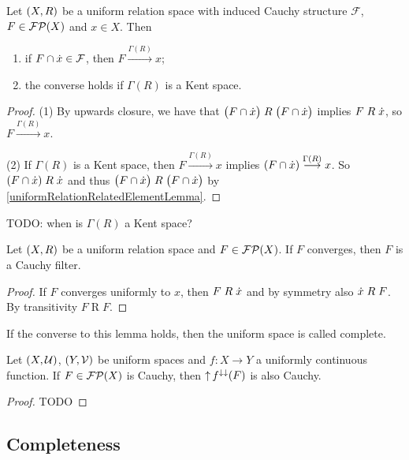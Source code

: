 \begin{lemma}
Let $\left( X,R \right)$ be a uniform relation space with induced Cauchy structure $\mathcal{F}$, $F\in \operatorname{\mathcal{FP}}(X)$ and $x\in X$. Then
\begin{enumerate}
\item if $F\cap\dot{x} \in \mathcal{F}$, then $F\overset{\Gamma(R)}{\longrightarrow} x$;
\item the converse holds if $\Gamma(R)$ is a Kent space.
\end{enumerate}
\end{lemma}
\begin{proof}
(1) By upwards closure, we have that $\big(F\cap \dot{x}\big)\mathrel{R}\big(F\cap \dot{x}\big)$ implies $F\mathrel{R}\dot{x}$, so $F\overset{\Gamma(R)}{\longrightarrow} x$.

(2) If $\Gamma(R)$ is a Kent space, then $F\overset{\Gamma(R)}{\longrightarrow} x$ implies $(F\cap\dot{x})\overset{\Gamma(R)}{\longrightarrow} x$. So $(F\cap\dot{x})\mathrel{R}\dot{x}$ and thus $\big(F\cap \dot{x}\big)\mathrel{R}\big(F\cap \dot{x}\big)$ by \ref{uniformRelationRelatedElementLemma}.
\end{proof}
TODO: when is $\Gamma(R)$ a Kent space?

\begin{lemma} \label{uniformlyConvergentImpliesCauchy}
Let $\left( X,R \right)$ be a uniform relation space and $F\in\operatorname{\mathcal{FP}}(X)$. If $F$ converges, then $F$ is a Cauchy filter.
\end{lemma}
\begin{proof}
If $F$ converges uniformly to $x$, then $F\mathrel{R}\dot{x}$ and by symmetry also $\dot{x}\mathrel{R}F$. By transitivity $F\mathrel{R}F$. 
\end{proof}
If the converse to this lemma holds, then the uniform space is called complete.

\begin{lemma} \label{continuousImageOfCauchy}
Let $\left( X,\mathcal{U} \right)$, $\left( Y,\mathcal{V} \right)$ be uniform spaces and $f: X\to Y$ a uniformly continuous function. If $F\in\operatorname{\mathcal{FP}}(X)$ is Cauchy, then $\operatorname{\uparrow} f^{\downarrow\downarrow}(F)$ is also Cauchy.
\end{lemma}
\begin{proof}
TODO
\end{proof}

\subsection{Completeness}

